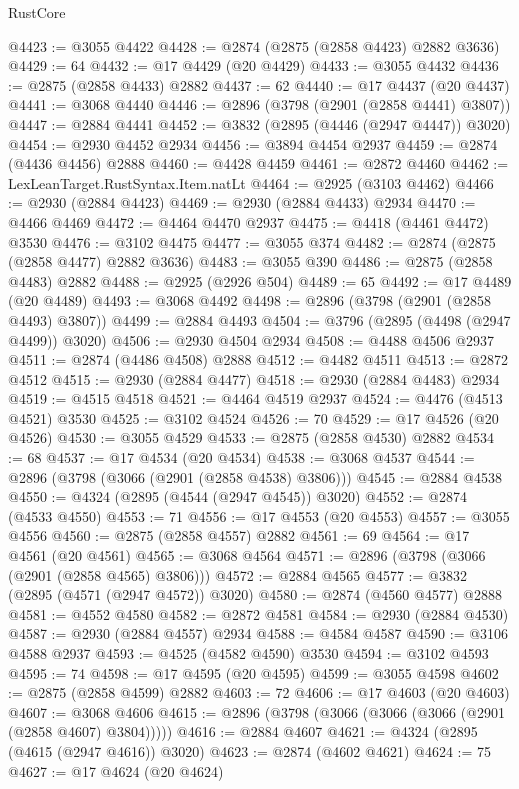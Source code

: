 \begin{lexlean}{RustCore}
\begin{coremodule}
@4423 := @3055 @4422
@4428 := @2874 (@2875 (@2858 @4423) @2882 @3636)
@4429 := 64
@4432 := @17 @4429 (@20 @4429)
@4433 := @3055 @4432
@4436 := @2875 (@2858 @4433) @2882
@4437 := 62
@4440 := @17 @4437 (@20 @4437)
@4441 := @3068 @4440
@4446 := @2896 (@3798 (@2901 (@2858 @4441) @3807))
@4447 := @2884 @4441
@4452 := @3832 (@2895 (@4446 (@2947 @4447)) @3020)
@4454 := @2930 @4452 @2934
@4456 := @3894 @4454 @2937
@4459 := @2874 (@4436 @4456) @2888
@4460 := @4428 @4459
@4461 := @2872 @4460
@4462 := LexLeanTarget.RustSyntax.Item.natLt
@4464 := @2925 (@3103 @4462)
@4466 := @2930 (@2884 @4423)
@4469 := @2930 (@2884 @4433) @2934
@4470 := @4466 @4469
@4472 := @4464 @4470 @2937
@4475 := @4418 (@4461 @4472) @3530
@4476 := @3102 @4475
@4477 := @3055 @374
@4482 := @2874 (@2875 (@2858 @4477) @2882 @3636)
@4483 := @3055 @390
@4486 := @2875 (@2858 @4483) @2882
@4488 := @2925 (@2926 @504)
@4489 := 65
@4492 := @17 @4489 (@20 @4489)
@4493 := @3068 @4492
@4498 := @2896 (@3798 (@2901 (@2858 @4493) @3807))
@4499 := @2884 @4493
@4504 := @3796 (@2895 (@4498 (@2947 @4499)) @3020)
@4506 := @2930 @4504 @2934
@4508 := @4488 @4506 @2937
@4511 := @2874 (@4486 @4508) @2888
@4512 := @4482 @4511
@4513 := @2872 @4512
@4515 := @2930 (@2884 @4477)
@4518 := @2930 (@2884 @4483) @2934
@4519 := @4515 @4518
@4521 := @4464 @4519 @2937
@4524 := @4476 (@4513 @4521) @3530
@4525 := @3102 @4524
@4526 := 70
@4529 := @17 @4526 (@20 @4526)
@4530 := @3055 @4529
@4533 := @2875 (@2858 @4530) @2882
@4534 := 68
@4537 := @17 @4534 (@20 @4534)
@4538 := @3068 @4537
@4544 := @2896 (@3798 (@3066 (@2901 (@2858 @4538) @3806)))
@4545 := @2884 @4538
@4550 := @4324 (@2895 (@4544 (@2947 @4545)) @3020)
@4552 := @2874 (@4533 @4550)
@4553 := 71
@4556 := @17 @4553 (@20 @4553)
@4557 := @3055 @4556
@4560 := @2875 (@2858 @4557) @2882
@4561 := 69
@4564 := @17 @4561 (@20 @4561)
@4565 := @3068 @4564
@4571 := @2896 (@3798 (@3066 (@2901 (@2858 @4565) @3806)))
@4572 := @2884 @4565
@4577 := @3832 (@2895 (@4571 (@2947 @4572)) @3020)
@4580 := @2874 (@4560 @4577) @2888
@4581 := @4552 @4580
@4582 := @2872 @4581
@4584 := @2930 (@2884 @4530)
@4587 := @2930 (@2884 @4557) @2934
@4588 := @4584 @4587
@4590 := @3106 @4588 @2937
@4593 := @4525 (@4582 @4590) @3530
@4594 := @3102 @4593
@4595 := 74
@4598 := @17 @4595 (@20 @4595)
@4599 := @3055 @4598
@4602 := @2875 (@2858 @4599) @2882
@4603 := 72
@4606 := @17 @4603 (@20 @4603)
@4607 := @3068 @4606
@4615 := @2896 (@3798 (@3066 (@3066 (@3066 (@2901 (@2858 @4607) @3804)))))
@4616 := @2884 @4607
@4621 := @4324 (@2895 (@4615 (@2947 @4616)) @3020)
@4623 := @2874 (@4602 @4621)
@4624 := 75
@4627 := @17 @4624 (@20 @4624)

\end{coremodule}
\end{lexlean}
